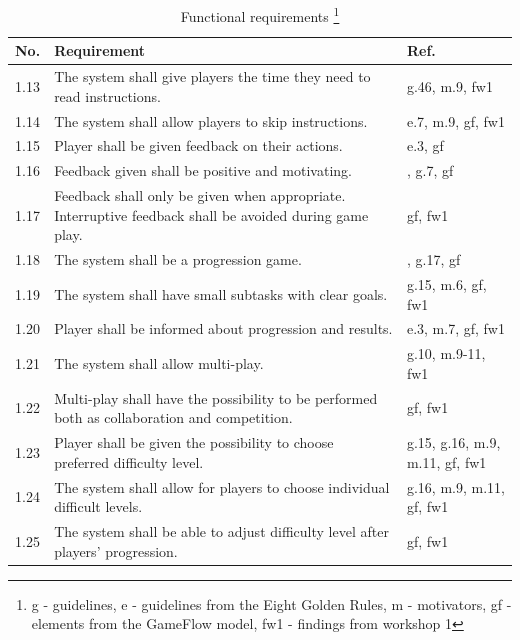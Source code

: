 \begin{minipage}{12 cm}
\begin{table} [H]
\centering
\begin{tabular}{|>{\raggedright}p{}|p{}|p{}|}
\hline
\textbf{No.} & \textbf{Requirement} & \textbf{Ref.} \\ \hline
1.13 & The system shall give players the time they need to read instructions. & g.46, m.9, fw1 \\ \hline 
1.14 & The system shall allow players to skip instructions. & e.7, m.9, gf, fw1 \\ \hline 
1.15 & Player shall be given feedback on their actions. &  e.3, gf \\ \hline
1.16 & Feedback given shall be positive and motivating. & \cite{project}, g.7, gf \\ \hline
1.17 & Feedback shall only be given when appropriate. Interruptive feedback shall be avoided during game play. & gf, fw1 \\ \hline
1.18 & The system shall be a progression game. & \cite{understandingvg}, g.17, gf \\ \hline
1.19 & The system shall have small subtasks with clear goals. & g.15, m.6, gf, fw1\\ \hline
1.20 & Player shall be informed about progression and results. & e.3, m.7, gf, fw1 \\ \hline
1.21 & The system shall allow multi-play. & g.10, m.9-11, fw1 \\ \hline
1.22 & Multi-play shall have the possibility to be performed both as collaboration and competition. & gf, fw1\\ \hline
1.23 & Player shall be given the possibility to choose preferred difficulty level. & g.15, g.16, m.9, m.11, gf, fw1\\ \hline
1.24 & The system shall allow for players to choose individual difficult levels. & g.16, m.9, m.11, gf, fw1\\ \hline
1.25 & The system shall be able to adjust difficulty level after players' progression. & gf, fw1 \\ \hline
    \end{tabular}
    \caption[Functional requirements, part 2]{Functional requirements \footnote{g - guidelines, e - guidelines from the Eight Golden Rules, m - motivators, gf - elements from the GameFlow model, fw1 - findings from workshop 1}}
    \label{tab:func2}
\end{table} 
\end{minipage}

